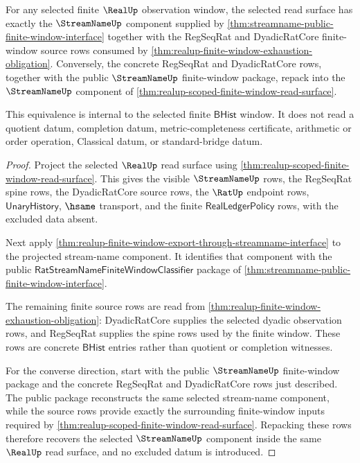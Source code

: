 \begin{theorem}
\label{thm:realup-streamname-source-exhaustion-equivalence}
For any selected finite $\RealUp$ observation window, the selected read surface
has exactly the $\StreamNameUp$ component supplied by
\autoref{thm:streamname-public-finite-window-interface} together with the
RegSeqRat and DyadicRatCore finite-window source rows consumed by
\autoref{thm:realup-finite-window-exhaustion-obligation}. Conversely, the
concrete RegSeqRat and DyadicRatCore rows, together with the public
$\StreamNameUp$ finite-window package, repack into the $\StreamNameUp$ component
of \autoref{thm:realup-scoped-finite-window-read-surface}.

This equivalence is internal to the selected finite $\mathsf{BHist}$ window. It
does not read a quotient datum, completion datum, metric-completeness
certificate, arithmetic or order operation, Classical datum, or standard-bridge
datum.
\end{theorem}
\begin{proof}
Project the selected $\RealUp$ read surface using
\autoref{thm:realup-scoped-finite-window-read-surface}. This gives the visible
$\StreamNameUp$ rows, the RegSeqRat spine rows, the DyadicRatCore source rows,
the $\RatUp$ endpoint rows, $\mathsf{UnaryHistory}$, $\hsame$ transport, and the
finite $\mathsf{RealLedgerPolicy}$ rows, with the excluded data absent.

Next apply \autoref{thm:realup-finite-window-export-through-streamname-interface}
to the projected stream-name component. It identifies that component with the
public $\mathsf{RatStreamNameFiniteWindowClassifier}$ package of
\autoref{thm:streamname-public-finite-window-interface}.

The remaining finite source rows are read from
\autoref{thm:realup-finite-window-exhaustion-obligation}: DyadicRatCore supplies
the selected dyadic observation rows, and RegSeqRat supplies the spine rows used
by the finite window. These rows are concrete $\mathsf{BHist}$ entries rather
than quotient or completion witnesses.

For the converse direction, start with the public $\StreamNameUp$ finite-window
package and the concrete RegSeqRat and DyadicRatCore rows just described. The
public package reconstructs the same selected stream-name component, while the
source rows provide exactly the surrounding finite-window inputs required by
\autoref{thm:realup-scoped-finite-window-read-surface}. Repacking these rows
therefore recovers the selected $\StreamNameUp$ component inside the same
$\RealUp$ read surface, and no excluded datum is introduced.
\end{proof}

